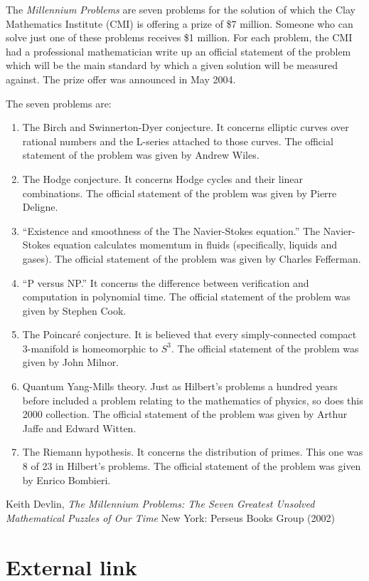 \documentclass[12pt]{article}
\begin{document}
The \emph{Millennium Problems} are seven problems for the solution of which the Clay Mathematics Institute (CMI) is offering a prize of \$7 million. Someone who can solve just one of these problems receives \$1 million. For each problem, the CMI had a professional mathematician write up an official statement of the problem which will be the main standard by which a given solution will be measured against. The prize offer was announced in May 2004.

The seven problems are:

\begin{enumerate}
\item The Birch and Swinnerton-Dyer conjecture. It concerns elliptic curves over rational numbers and the L-series attached to those curves. The official statement of the problem was given by Andrew Wiles.
\item The Hodge conjecture. It concerns Hodge cycles and their linear combinations. The official statement of the problem was given by Pierre Deligne.
\item ``Existence and smoothness of the The Navier-Stokes equation.'' The Navier-Stokes equation calculates momemtum in fluids (specifically, liquids and gases). The official statement of the problem was given by Charles Fefferman.
\item ``P versus NP.'' It concerns the difference between verification and computation in polynomial time. The official statement of the problem was given by Stephen Cook.
\item The Poincar\'e conjecture. It is believed that every simply-connected compact 3-manifold is homeomorphic to $S^3$. The official statement of the problem was given by John Milnor.
\item Quantum Yang-Mills theory. Just as Hilbert's problems a hundred years before included a problem relating to the mathematics of physics, so does this 2000 collection. The official statement of the problem was given by Arthur Jaffe and Edward Witten. %
\item The Riemann hypothesis. It concerns the distribution of primes. This one was 8 of 23 in Hilbert's problems. The official statement of the problem was given by Enrico Bombieri.
\end{enumerate}

\begin{thebibliography}{1}
 Keith Devlin, {\it The Millennium Problems: The Seven Greatest Unsolved Mathematical Puzzles of Our Time} New York: Perseus Books Group (2002)
\end{thebibliography}

\section{External link}

\end{document}
